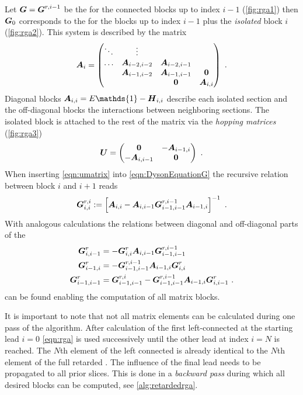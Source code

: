 Let $\boldsymbol{G}=\boldsymbol{G}^{r,i-1}$ be the \gfnc{} for the connected blocks up to index $i-1$ (\cref{fig:rga1}) then $\boldsymbol{G}_0$ corresponds to the \gfnc{} for the blocks up to index $i-1$ plus the \emph{isolated} block $i$ (\cref{fig:rga2}). This system is described by the matrix
\begin{align}
\boldsymbol{A}_i = 
\begin{pmatrix}
\ddots 	& \vdots 	   & 		   & \\
\dots   & \boldsymbol{A}_{i-2,i-2}&\boldsymbol{A}_{i-2,i-1}& \\
     	& \boldsymbol{A}_{i-1,i-2}  &\boldsymbol{A}_{i-1,i-1}  & \boldsymbol{0} \\ 
	&  		   & \boldsymbol{0} 	   & \boldsymbol{A}_{i,i}
\end{pmatrix}\ .
\end{align}
Diagonal blocks $\mat{A}_{i,i} = E\mathds{1}-\mat{H}_{i,i}$ describe each isolated section and the off-diagonal blocks the interactions between neighboring sections. The isolated block is attached to the rest of the matrix via the \emph{hopping matrices} (\cref{fig:rga3})
\begin{align}
\boldsymbol{U} = 
\begin{pmatrix}
\boldsymbol{0}& -\boldsymbol{A}_{i-1,i}\\
-\boldsymbol{A}_{i,i-1}&\boldsymbol{0}
\end{pmatrix}\ .
\label{eqn:umatrix}
\end{align}
When inserting \cref{eqn:umatrix} into \cref{eqn:DysonEquationG} the recursive relation between block $i$ and $i+1$ reads 
\begin{align}
\mat{G}^{r,i}_{i,i} := \left[\mat{A}_{i,i}-\mat{A}_{i,i-1}\mat{G}^{r,i-1}_{i-1,i-1}\mat{A}_{i-1,i}\right]^{-1}\ .
\label{eqn:rga}
\end{align}
With analogous calculations the relations between diagonal and off-diagonal parts  of the \gfnc{} 
\begin{align}
\mat{G}^r_{i,i-1} &= -\mat{G}^r_{i,i}\mat{A}_{i,i-1}\mat{G}^{r,i-1}_{i-1,i-1}\\
\mat{G}^r_{i-1,i} &= -\mat{G}^{r,i-1}_{i-1,i-1}\mat{A}_{i-1,i} \mat{G}^{r}_{i,i}\\
\mat{G}^r_{i-1,i-1} &= \mat{G}^{r,i}_{i-1,i-1}-\mat{G}^{r,i-1}_{i-1,i-1}\mat{A}_{i-1,i}\mat{G}^{r}_{i,i-1}\ .
\end{align}
can be found enabling the computation of all matrix blocks.\par
It is important to note that not all matrix elements can be calculated during one pass of the algorithm. After calculation of the first left-connected \gfnc{} at the starting lead $i=0$ \cref{eqn:rga} is used successively until the other lead at index $i=N$ is reached. The $N$th element of the left connected \gfnc{} is already identical to the $N$th element of the full retarded \gfnc{}. The influence of the final lead needs to be propagated to all prior slices. This is done in a \emph{backward pass} during which all desired blocks can be computed, see \cref{alg:retardedrga}.\par
